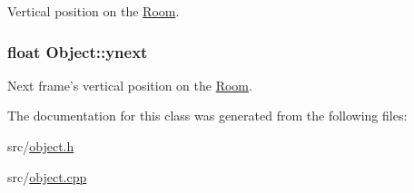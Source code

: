 Vertical position on the \hyperlink{class_room}{Room}. 

\hypertarget{class_object_a23acb9460963396dc0bda8d9dc0c6771}{
\subsubsection[{ynext}]{\setlength{\rightskip}{0pt plus 5cm}float Object\-::ynext\hspace{0.3cm}{\ttfamily [protected]}}}\label{class_object_a23acb9460963396dc0bda8d9dc0c6771}


Next frame's vertical position on the \hyperlink{class_room}{Room}. 



The documentation for this class was generated from the following files\-:\begin{DoxyCompactItemize}
\item 
src/\hyperlink{object_8h}{object.\-h}\item 
src/\hyperlink{object_8cpp}{object.\-cpp}\end{DoxyCompactItemize}
